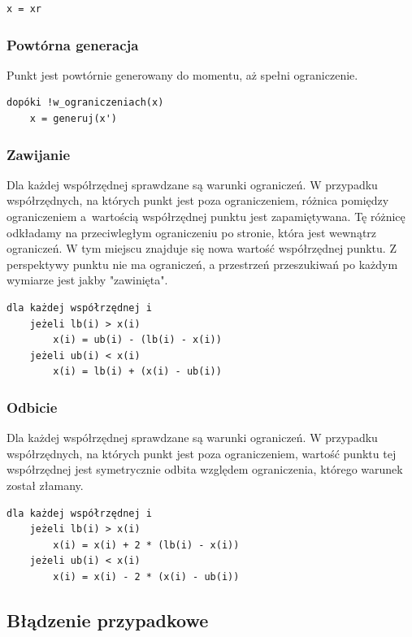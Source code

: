 \documentclass{mini}
\begin{document}
\begin{Verbatim}[baselinestretch=1.1]
x = xr
\end{Verbatim}

\subsubsection{Powtórna generacja}
Punkt jest powtórnie generowany do momentu, aż spełni ograniczenie.

\begin{Verbatim}[baselinestretch=1.1]
dopóki !w_ograniczeniach(x)
	x = generuj(x')
\end{Verbatim}

\subsubsection{Zawijanie}
Dla każdej współrzędnej sprawdzane są warunki ograniczeń. W przypadku współrzędnych, na których punkt jest poza ograniczeniem, różnica pomiędzy ograniczeniem a~wartością współrzędnej punktu jest zapamiętywana. Tę różnicę odkładamy na przeciwległym ograniczeniu po stronie, która jest wewnątrz ograniczeń. W tym miejscu znajduje się nowa wartość współrzędnej punktu. Z perspektywy punktu nie ma ograniczeń, a przestrzeń przeszukiwań po każdym wymiarze jest jakby "zawinięta".

\begin{Verbatim}[baselinestretch=1.1]
dla każdej współrzędnej i
	jeżeli lb(i) > x(i)
		x(i) = ub(i) - (lb(i) - x(i))
	jeżeli ub(i) < x(i)
		x(i) = lb(i) + (x(i) - ub(i))
\end{Verbatim}

\subsubsection{Odbicie}
Dla każdej współrzędnej sprawdzane są warunki ograniczeń. W przypadku współrzędnych, na których punkt jest poza ograniczeniem, wartość punktu tej współrzędnej jest symetrycznie odbita względem ograniczenia, którego warunek został złamany.

\begin{Verbatim}[baselinestretch=1.1]
dla każdej współrzędnej i
	jeżeli lb(i) > x(i)
		x(i) = x(i) + 2 * (lb(i) - x(i))
	jeżeli ub(i) < x(i)
		x(i) = x(i) - 2 * (x(i) - ub(i))
\end{Verbatim}

\subsection{Błądzenie przypadkowe} \label{bladzenie}
\end{document}
